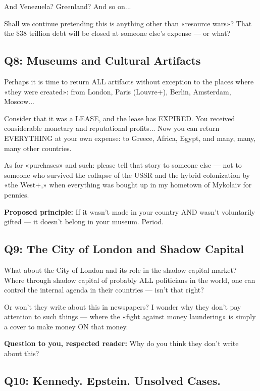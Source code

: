 \documentclass[11pt,a4paper]{article}
\theoremstyle{definition}
\theoremstyle{remark}
\begin{document}
And Venezuela? Greenland? And so on...

Shall we continue pretending this is anything other than «resource wars»? That the \$38 trillion debt will be closed at someone else's expense — or what?

\subsection{Q8: Museums and Cultural Artifacts}

Perhaps it is time to return ALL artifacts without exception to the places where «they were created»: from London, Paris (Louvre+), Berlin, Amsterdam, Moscow...

Consider that it was a LEASE, and the lease has EXPIRED. You received considerable monetary and reputational profits... Now you can return EVERYTHING at your own expense: to Greece, Africa, Egypt, and many, many, many other countries.

As for «purchases» and such: please tell that story to someone else — not to someone who survived the collapse of the USSR and the hybrid colonization by «the West+,» when everything was bought up in my hometown of Mykolaiv for pennies.

\textbf{Proposed principle:} If it wasn't made in your country AND wasn't voluntarily gifted — it doesn't belong in your museum. Period.

\subsection{Q9: The City of London and Shadow Capital}

What about the City of London and its role in the shadow capital market? Where through shadow capital of probably ALL politicians in the world, one can control the internal agenda in their countries — isn't that right?

Or won't they write about this in newspapers? I wonder why they don't pay attention to such things — where the «fight against money laundering» is simply a cover to make money ON that money.

\textbf{Question to you, respected reader:} Why do you think they don't write about this?

\subsection{Q10: Kennedy. Epstein. Unsolved Cases.}
\end{document}
